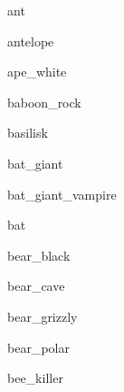 \documentclass[letterpaper,serif]{module}
\begin{document}
\begin{newmonster}{ant}\end{newmonster}

\begin{newmonster}{antelope}\end{newmonster}

\begin{newmonster}{ape_white}\end{newmonster}

\begin{newmonster}{baboon_rock}\end{newmonster}

\begin{newmonster}{basilisk}\end{newmonster}

\begin{newmonster}{bat_giant}\end{newmonster}

\begin{newmonster}{bat_giant_vampire}\end{newmonster}

\begin{newmonster}{bat}\end{newmonster}

\begin{newmonster}{bear_black}\end{newmonster}

\begin{newmonster}{bear_cave}\end{newmonster}

\begin{newmonster}{bear_grizzly}\end{newmonster}

\begin{newmonster}{bear_polar}\end{newmonster}

\begin{newmonster}{bee_killer}\end{newmonster}
\end{document}

